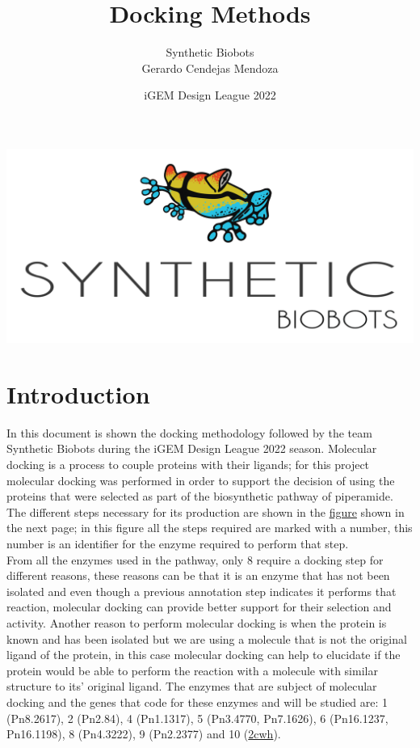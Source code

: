 \documentclass[12pt]{article}
\begin{document}
	
	\title {Docking Methods}
	\date{iGEM Design League 2022}
	\author{Synthetic Biobots\\Gerardo Cendejas Mendoza}
	
	\maketitle

	\begin{center}
		\includegraphics[scale=0.4]{SB.png}
	\end{center}

	\newpage
	
	\section*{Introduction}
	
	In this document is shown the docking methodology followed by the team  Synthetic Biobots during the iGEM Design League 2022 season. Molecular docking is a process to couple proteins with their ligands; for this project molecular docking was performed in order to support the decision of using the proteins that were selected as part of the biosynthetic pathway of piperamide. The different steps necessary for its production are shown in the \hyperlink{pathway}{figure} shown in the next page; in this figure all the steps required are marked with a number, this number is an identifier for the enzyme required to perform that step.\\
	
	From all the enzymes used in the pathway, only 8 require a docking step for different reasons, these reasons can be that it is an enzyme that has not been isolated and even though a previous annotation step indicates it performs that reaction, molecular docking can provide better support for their selection and activity. Another reason to perform molecular docking is when the protein is known and has been isolated but we are using a molecule that is not the original ligand of the protein, in this case molecular docking can help to elucidate if the protein would be able to perform the reaction with a molecule with similar structure to its' original ligand. The enzymes that are subject of molecular docking and the genes that code for these enzymes and will be studied are: 1 (Pn8.2617), 2 (Pn2.84), 4 (Pn1.1317), 5 (Pn3.4770, Pn7.1626), 6 (Pn16.1237, Pn16.1198), 8 (Pn4.3222), 9 (Pn2.2377) and 10 (\href{https://www.rcsb.org/structure/2CWH}{2cwh}).\\
	
\end{document}
